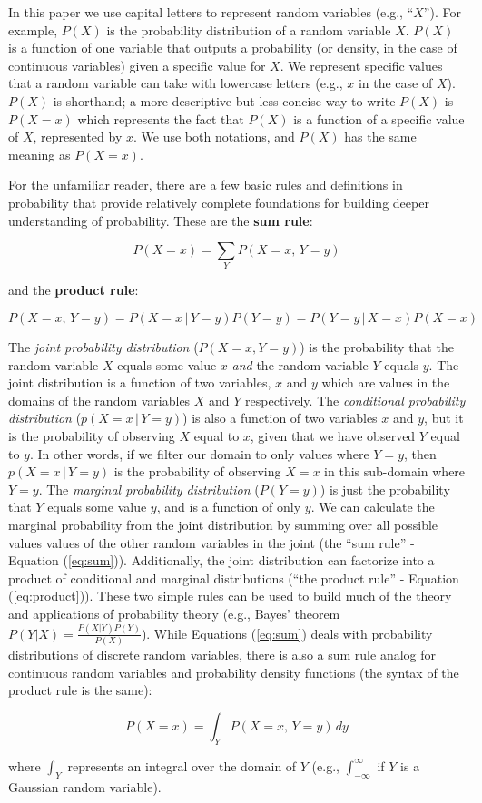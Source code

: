 \documentclass[12pt]{article}
\begin{document}
In this paper we use capital letters to represent random variables
(e.g., ``$X$''). For example, $P(X)$ is the probability distribution
of a random variable $X$. $P(X)$ is a function of one variable that
outputs a probability (or density, in the case of continuous
variables) given a specific value for $X$. We represent specific
values that a random variable can take with lowercase letters (e.g.,
$x$ in the case of $X$). $P(X)$ is shorthand; a more descriptive but
less concise way to write $P(X)$ is $P(X=x)$ which represents the fact
that $P(X)$ is a function of a specific value of $X$, represented by
$x$. We use both notations, and $P(X)$ has the same meaning as
$P(X=x)$.

For the unfamiliar reader, there are a few basic rules and definitions
in probability that provide relatively complete foundations for
building deeper understanding of probability. These are the \textbf{sum rule}:

\begin{equation}
  P(X=x) = \sum_Y P(X=x,\, Y=y)
  \label{eq:sum}
\end{equation}

and the \textbf{product rule}:

\begin{equation}
  P(X=x, \, Y=y) = P(X = x \, | \, Y=y ) P(Y=y) = P(Y = y \, | \, X=x ) P(X=x)
  \label{eq:product}
\end{equation}

The \textit{joint probability distribution} ($P(X=x,Y=y)$) is the
probability that the random variable $X$ equals some value $x$ \emph{and} the
random variable $Y$ equals $y$. The joint distribution is a function
of two variables, $x$ and $y$ which are values in the domains of the
random variables $X$ and $Y$ respectively. The \textit{conditional
  probability distribution} ($p(X = x \, | \, Y=y )$) is also a
function of two variables $x$ and $y$, but it is the probability of
observing $X$ equal to $x$, given that we have observed $Y$ equal to
$y$. In other words, if we filter our domain to only values where
$Y=y$, then $p(X = x \, | \, Y=y )$ is the probability of
observing $X=x$ in this sub-domain where $Y=y$. The \textit{marginal
  probability distribution} ($P(Y=y)$) is just the probability that
$Y$ equals some value $y$, and is a function of only $y$. We can
calculate the marginal probability from the joint distribution by
summing over all possible values values of the other random variables
in the joint (the ``sum rule'' - Equation (\ref{eq:sum})). Additionally,
the joint distribution can factorize into a product of conditional and
marginal distributions (``the product rule'' - Equation
(\ref{eq:product})). These two simple rules can be used to build much of the
theory and applications of probability theory (e.g., Bayes' theorem
$P(Y|X) =\frac{P(X|Y) P(Y)}{P(X)}$). While Equations (\ref{eq:sum})
deals with probability distributions of discrete random variables,
there is also a sum rule analog for continuous random variables and
probability density functions (the syntax of the product rule is the
same):

\begin{equation*}
  P(X=x) = \int_Y P(X=x,\, Y=y) \, dy
\end{equation*}

where $\int_{Y}$ represents an integral over the domain of $Y$ (e.g.,
$\int_{-\infty}^{\infty}$ if $Y$ is a Gaussian random variable).
\end{document}
